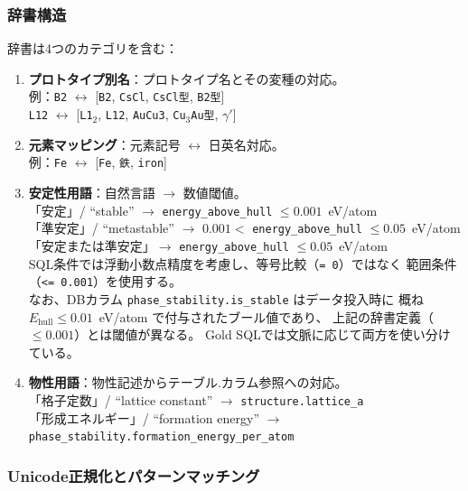 \documentclass[5p,twocolumn]{elsarticle}
\begin{document}
\subsubsection{辞書構造}

辞書は4つのカテゴリを含む：

\begin{enumerate}
  \item \textbf{プロトタイプ別名}：プロトタイプ名とその変種の対応。\\
    例：\texttt{B2} $\leftrightarrow$ [\texttt{B2}, \texttt{CsCl}, \texttt{CsCl型}, \texttt{B2型}]\\
    \texttt{L12} $\leftrightarrow$ [\texttt{L1$_2$}, \texttt{L12}, \texttt{AuCu3}, \texttt{Cu$_3$Au型}, \texttt{$\gamma'$}]

  \item \textbf{元素マッピング}：元素記号 $\leftrightarrow$ 日英名対応。\\
    例：\texttt{Fe} $\leftrightarrow$ [\texttt{Fe}, \texttt{鉄}, \texttt{iron}]

  \item \textbf{安定性用語}：自然言語 $\to$ 数値閾値。\\
    「安定」/ ``stable'' $\to$ \texttt{energy\_above\_hull} $\leq 0.001$~eV/atom\\
    「準安定」/ ``metastable'' $\to$ $0.001 <$ \texttt{energy\_above\_hull} $\leq 0.05$~eV/atom\\
    「安定または準安定」$\to$ \texttt{energy\_above\_hull} $\leq 0.05$~eV/atom\\
    SQL条件では浮動小数点精度を考慮し、等号比較（\texttt{= 0}）ではなく
    範囲条件（\texttt{<= 0.001}）を使用する。\\
    なお、DBカラム \texttt{phase\_stability.is\_stable} はデータ投入時に
    概ね $E_\text{hull} \leq 0.01$~eV/atom で付与されたブール値であり、
    上記の辞書定義（$\leq 0.001$）とは閾値が異なる。
    Gold SQLでは文脈に応じて両方を使い分けている。

  \item \textbf{物性用語}：物性記述からテーブル.カラム参照への対応。\\
    「格子定数」/ ``lattice constant'' $\to$ \texttt{structure.lattice\_a}\\
    「形成エネルギー」/ ``formation energy'' $\to$ \texttt{phase\_stability.formation\_energy\_per\_atom}
\end{enumerate}

\subsubsection{Unicode正規化とパターンマッチング}
\end{document}
